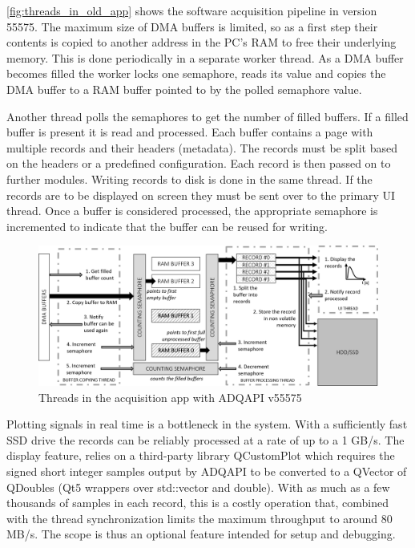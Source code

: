 \autoref{fig:threads_in_old_app} shows the software acquisition pipeline in version 55575.
The maximum size of DMA buffers is limited, so as a first
step their contents is copied to another address in the PC's RAM 
to free their underlying memory.
This is done periodically in a separate worker thread.
As a DMA buffer becomes filled the worker locks one semaphore, reads its value
and copies the DMA buffer to a RAM buffer pointed to by the polled semaphore value.


Another thread polls the semaphores to get the number of filled buffers.
If a filled buffer is present it is read and processed. 
Each buffer contains a page with multiple records and their headers (metadata).
The records must be split based on the headers or a predefined configuration.
Each record is then passed on to further modules. Writing records to disk
is done in the same thread. If the records are to be displayed on screen
they must be sent over to the primary UI thread. 
Once a buffer is considered processed, the appropriate semaphore is incremented
to indicate that the buffer can be reused for writing.

\begin{figure}[H]
  \centering
  \includegraphics[width=\linewidth]{media/threads_in_old_app.png}
  \caption{Threads in the acquisition app with ADQAPI v55575}
  \label{fig:threads_in_old_app} 
\end{figure}

Plotting signals in real time is a bottleneck in the system. With a sufficiently fast
SSD drive the records can be reliably processed at a rate of up to a 1 GB/s.
The display feature, relies on a third-party library QCustomPlot which requires
the signed short integer samples output by ADQAPI
to be converted to a QVector of QDoubles (Qt5 wrappers over std::vector and double).
With as much as a few thousands of samples in each record, this is a costly operation that,
combined with the thread synchronization limits the maximum throughput to around 80 MB/s.
The scope is thus an optional feature intended for setup and debugging.


